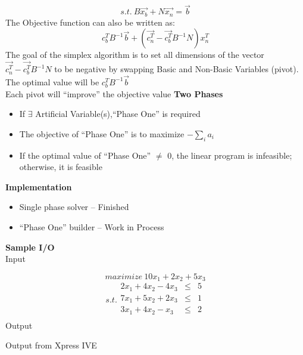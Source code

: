 \documentclass[landscape,letterpaper,pdftex]{slides}
\begin{document}
	\[s.t.\ B\vec{x_b} + N\vec{x_n} = \vec{b}\]
	\newpage
	The Objective function can also be written as:
	\[c_{b}^{T}B^{-1}\vec{b} + (\vec{c_{n}^{T}} - \vec{c_{b}^{T}}B^{-1}N)x_{n}^{T}\]
	The goal of the simplex algorithm is to set all dimensions of the vector $\vec{c_{n}^{T}} - \vec{c_{b}^{T}}B^{-1}N$ to be negative by swapping Basic and Non-Basic Variables (pivot).\\
	The optimal value will be $c_{b}^{T}B^{-1}\vec{b}$\\
	Each pivot will ``improve'' the objective value
	\newpage
	\large{\textbf{Two Phases}}
	\begin{itemize}
		\item
		If $\exists$ Artificial Variable(s),``Phase One'' is required
		\item
		The objective of ``Phase One'' is to maximize $-\sum_{i}{a_i}$
		\item
		If the optimal value of ``Phase One'' $\neq$ 0, the linear program is infeasible; otherwise, it is feasible
	\end{itemize}
	\large{\textbf{Implementation}}
	\begin{itemize}
		\item
		Single phase solver -- Finished
		\item
		``Phase One'' builder -- Work in Process
	\end{itemize}
	\newpage
	
	\newpage
	
	\newpage
	\large{\textbf{Sample I/O}}\\
	Input
	
	\newpage
	\[maximize\ 10x_1 + 2x_2 + 5x_3\]
	\[s.t.\begin{array}{lcl}
	2x_1 + 4x_2 - 4x_3 &\leqslant &5\\
	7x_1 + 5x_2 + 2x_3 &\leqslant &1\\
	3x_1 + 4x_2 - x_3  &\leqslant &2\\
	\end{array}\]
	\newpage
	Output
	
	\newpage
	Output from Xpress IVE
	
\end{document}
